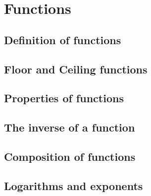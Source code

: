 \section{Functions}
\subsection{Definition of functions}
\subsection{Floor and Ceiling functions}
\subsection{Properties of functions}
\subsection{The inverse of a function}
\subsection{Composition of functions}
\subsection{Logarithms and exponents}
